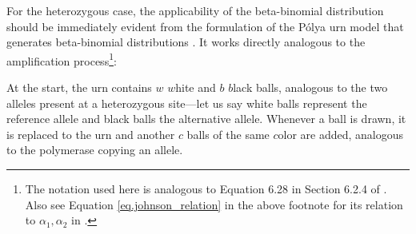 \documentclass[authoryear,preprint,11pt]{scrartcl}
\begin{document}
For the heterozygous case, the applicability of the beta-binomial distribution \citep{irwin_distribution_1954} should be immediately evident from the formulation of the Pólya urn model \citep{eggenberger_uber_1923} that generates beta-binomial distributions \citep{irwin_distribution_1954,johnson_univariate_2005}.
It works directly analogous to the amplification process\footnote{The notation used here is analogous to Equation 6.28 in Section 6.2.4 of \cite{johnson_univariate_2005}. Also see Equation \ref{eq.johnson_relation} in the above footnote for its relation to $\alpha_1, \alpha_2$ in \cite{lodato_somatic_2015}.}:

At the start, the urn contains $w$ $w$hite and $b$ $b$lack balls, analogous to the two alleles present at a heterozygous site---let us say white balls represent the reference allele and black balls the alternative allele.
Whenever a ball is drawn, it is replaced to the urn and another $c$ balls of the same $c$olor are added, analogous to the polymerase copying an allele.
\end{document}
